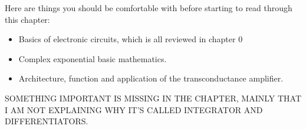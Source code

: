 Here are things you should be comfortable with before starting to read through this chapter: 
\begin{itemize}
    \item Basics of electronic circuits, which is all reviewed in chapter 0
    \item Complex exponential basic mathematics.  
    \item Architecture, function and application of the transconductance amplifier.
\end{itemize}

SOMETHING IMPORTANT IS MISSING IN THE CHAPTER, MAINLY THAT I AM NOT EXPLAINING WHY IT'S CALLED INTEGRATOR AND DIFFERENTIATORS.






